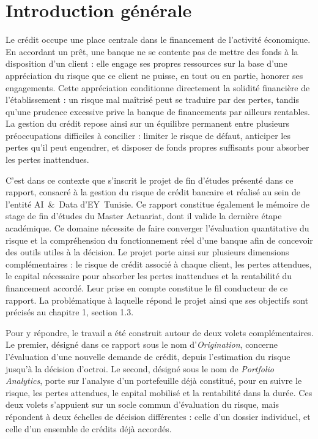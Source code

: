 \chapter*{Introduction générale}

Le crédit occupe une place centrale dans le financement de l'activité économique. En accordant un prêt, une banque ne se contente pas de mettre des fonds à la disposition d'un client : elle engage ses propres ressources sur la base d'une appréciation du risque que ce client ne puisse, en tout ou en partie, honorer ses engagements. Cette appréciation conditionne directement la solidité financière de l'établissement : un risque mal maîtrisé peut se traduire par des pertes, tandis qu'une prudence excessive prive la banque de financements par ailleurs rentables. La gestion du crédit repose ainsi sur un équilibre permanent entre plusieurs préoccupations difficiles à concilier : limiter le risque de défaut, anticiper les pertes qu'il peut engendrer, et disposer de fonds propres suffisants pour absorber les pertes inattendues.

C'est dans ce contexte que s'inscrit le projet de fin d'études présenté dans ce rapport, consacré à la gestion du risque de crédit bancaire et réalisé au sein de l'entité AI~\&~Data d'EY~Tunisie. Ce rapport constitue également le mémoire de stage de fin d'études du Master Actuariat, dont il valide la dernière étape académique. Ce domaine nécessite de faire converger l'évaluation quantitative du risque et la compréhension du fonctionnement réel d'une banque afin de concevoir des outils utiles à la décision. Le projet porte ainsi sur plusieurs dimensions complémentaires : le risque de crédit associé à chaque client, les pertes attendues, le capital nécessaire pour absorber les pertes inattendues et la rentabilité du financement accordé. Leur prise en compte constitue le fil conducteur de ce rapport. La problématique à laquelle répond le projet ainsi que ses objectifs sont précisés au chapitre 1, section 1.3.

Pour y répondre, le travail a été construit autour de deux volets complémentaires. Le premier, désigné dans ce rapport sous le nom d'\emph{Origination}, concerne l'évaluation d'une nouvelle demande de crédit, depuis l'estimation du risque jusqu'à la décision d'octroi. Le second, désigné sous le nom de \emph{Portfolio Analytics}, porte sur l'analyse d'un portefeuille déjà constitué, pour en suivre le risque, les pertes attendues, le capital mobilisé et la rentabilité dans la durée. Ces deux volets s'appuient sur un socle commun d'évaluation du risque, mais répondent à deux échelles de décision différentes : celle d'un dossier individuel, et celle d'un ensemble de crédits déjà accordés.

